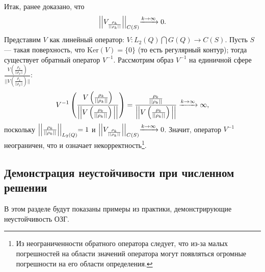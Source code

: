 \documentclass[a4paper, 12pt]{article}
\begin{document}
Итак, ранее доказано, что $$\Bigl|\Bigl|V_{\frac{\rho_k}{||\rho_k ||}}  \Bigl|\Bigl|_{C(S)}\xrightarrow{k \rightarrow \infty} 0.$$
Представим $V$ как линейный оператор: $V: L_2(Q) \bigcap G(Q) \rightarrow C(S)$. Пусть $S$ --- такая поверхность, что $\text{Ker} (V)=\{0\}$ (то есть регулярный контур);
тогда существует обратный оператор $V^{-1}$.
Рассмотрим образ $V^{-1}$ на единичной сфере $\frac{V\left(\frac{\rho_k}{||\rho_k ||}\right)}{||V\left(\frac{\rho_k}{||\rho_k ||}\right)||}$:
\begin{equation}
  V^{-1}\left(\frac{V\left(\frac{\rho_k}{||\rho_k ||}\right)}{\Bigl|\Bigl|V\left(\frac{\rho_k}{||\rho_k ||}\right)\Bigl|\Bigl|}\right)=\frac{\frac{\rho_k}{||\rho_k ||}}{\Bigl|\Bigl|V\left(\frac{\rho_k}{||\rho_k ||}\right)\Bigl|\Bigl|} \xrightarrow{k\rightarrow \infty} \infty,
\end{equation}
поскольку $\Bigl|\Bigl|\frac{\rho_k}{||\rho_k ||}\Bigl|\Bigl|_{L_2(Q)}=1$ и $\Bigl|\Bigl|V_{\frac{\rho_k}{||\rho_k ||}}  \Bigl|\Bigl|_{C(S)}\xrightarrow{k \rightarrow \infty} 0$.
Значит, оператор $V^{-1}$ неограничен, что и означает некорректность\footnote{Из неограниченности обратного оператора следует, что из-за малых погрешностей на области значений оператора могут появляться огромные погрешности на его области определения.}.

\subsection{Демонстрация неустойчивости при численном решении}
В этом разделе будут показаны примеры из практики, демонстрирующие неустойчивость ОЗГ.
\end{document}
